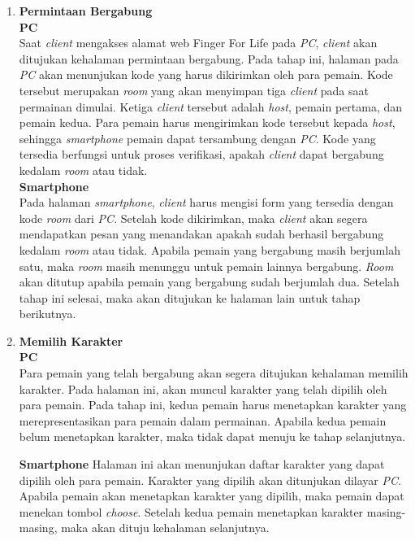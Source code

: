 \begin{enumerate}
	\item \textbf{Permintaan Bergabung} \\
	
	\textbf{PC} \\
	Saat \textit{client} mengakses alamat web Finger For Life pada \textit{PC}, \textit{client} akan ditujukan kehalaman permintaan bergabung. Pada tahap ini, halaman pada \textit{PC} akan menunjukan kode yang harus dikirimkan oleh para pemain. Kode tersebut merupakan \textit{room} yang akan menyimpan tiga \textit{client} pada saat permainan dimulai. Ketiga \textit{client} tersebut adalah \textit{host}, pemain pertama, dan pemain kedua. Para pemain harus mengirimkan kode tersebut kepada \textit{host}, sehingga \textit{smartphone} pemain dapat tersambung dengan \textit{PC}. Kode yang tersedia berfungsi untuk proses verifikasi, apakah \textit{client} dapat bergabung kedalam \textit{room} atau tidak. \\
	
	\textbf{Smartphone} \\
	Pada halaman \textit{smartphone}, \textit{client} harus mengisi form yang tersedia dengan kode \textit{room} dari \textit{PC}. Setelah kode dikirimkan, maka \textit{client} akan segera mendapatkan pesan yang menandakan apakah sudah berhasil bergabung kedalam \textit{room} atau tidak. Apabila pemain yang bergabung masih berjumlah satu, maka \textit{room} masih menunggu untuk pemain lainnya bergabung. \textit{Room} akan ditutup apabila pemain yang bergabung sudah berjumlah dua. Setelah tahap ini selesai, maka akan ditujukan ke halaman lain untuk tahap berikutnya.
	
	\item \textbf{Memilih Karakter} \\
	
	\textbf{PC} \\
	Para pemain yang telah bergabung akan segera ditujukan kehalaman memilih karakter. Pada halaman ini, akan muncul karakter yang telah dipilih oleh para pemain. Pada tahap ini, kedua pemain harus menetapkan karakter yang merepresentasikan para pemain dalam permainan. Apabila kedua pemain belum menetapkan karakter, maka tidak dapat menuju ke tahap selanjutnya.
	
	\textbf{Smartphone}
	Halaman ini akan menunjukan daftar karakter yang dapat dipilih oleh para pemain. Karakter yang dipilih akan ditunjukan dilayar \textit{PC}. Apabila pemain akan menetapkan karakter yang dipilih, maka pemain dapat menekan tombol \textit{choose}. Setelah kedua pemain menetapkan karakter masing-masing, maka akan dituju kehalaman selanjutnya.
	

\end{enumerate}
